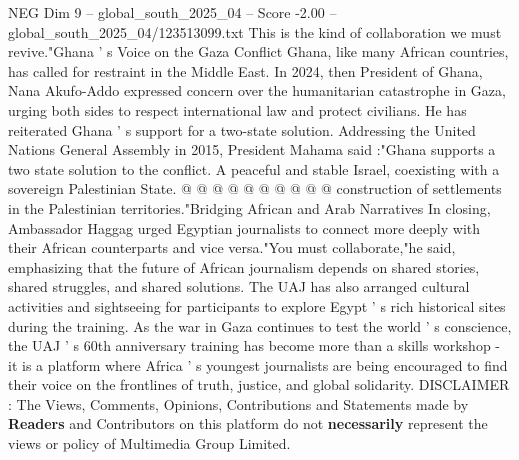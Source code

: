\begin{textsample}{NEG Dim 9 – global\_south\_2025\_04 – Score -2.00 – global\_south\_2025\_04/123513099.txt}
This is the kind of collaboration we must revive."Ghana ' s Voice on the Gaza Conflict Ghana, like many African countries, has called for restraint in the Middle East.
In 2024, then President of Ghana, Nana Akufo-Addo expressed concern over the humanitarian catastrophe in Gaza, urging both sides to respect international law and protect civilians.
He has reiterated Ghana ' s support for a two-state solution.
Addressing the United Nations General Assembly in 2015, President Mahama said :"Ghana supports a two state solution to the conflict.
A peaceful and stable Israel, coexisting with a sovereign Palestinian State. @ @ @ @ @ @ @ @ @ @ construction of settlements in the Palestinian territories."Bridging African and Arab Narratives In closing, Ambassador Haggag urged Egyptian journalists to connect more deeply with their African counterparts and vice versa."You must collaborate,"he said, emphasizing that the future of African journalism depends on shared stories, shared struggles, and shared solutions.
The UAJ has also arranged cultural activities and sightseeing for participants to explore Egypt ' s rich historical sites during the training.
As the war in Gaza continues to test the world ' s conscience, the UAJ ' s 60th anniversary training has become more than a skills workshop - it is a platform where Africa ' s youngest journalists are being encouraged to find their voice on the frontlines of truth, justice, and global solidarity.
DISCLAIMER : The Views, Comments, Opinions, Contributions and Statements made by \textbf{Readers} and Contributors on this platform do not \textbf{necessarily} represent the views or policy of Multimedia Group Limited.

\end{textsample}
